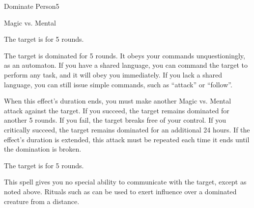 \begin{spellsection}{Dominate Person}{5}
    \begin{spellheader}
    \end{spellheader}
    \begin{spellcontent}
        \begin{spelltargetinginfo}
        \end{spelltargetinginfo}
        \begin{spelleffects}
            \begin{spellattack}{Magic vs. Mental}

                \spellsuccess The target is \confused for 5 rounds.

                \spellcritical The target is dominated for 5 rounds. It obeys your commands unquestioningly, as an automaton. If you have a shared language, you can command the target to perform any task, and it will obey you immediately. If you lack a shared language, you can still issue simple commands, such as ``attack'' or ``follow''.

                When this effect's duration ends, you must make another Magic vs. Mental attack against the target. If you succeed, the target remains dominated for another 5 rounds. If you fail, the target breaks free of your control. If you critically succeed, the target remains dominated for an additional 24 hours. If the effect's duration is extended, this attack must be repeated each time it ends until the domination is broken.

                \spellfailure The target is \dazed for 5 rounds.
            \end{spellattack}
            \spelldur \durshort \dismissable
        \end{spelleffects}
    \end{spellcontent}
    \begin{spellfooter}
        \spellnotes This spell gives you no special ability to communicate with the target, except as noted above. Rituals such as  can be used to exert influence over a dominated creature from a distance.
        \miscastrandom
    \end{spellfooter}
\end{spellsection}

